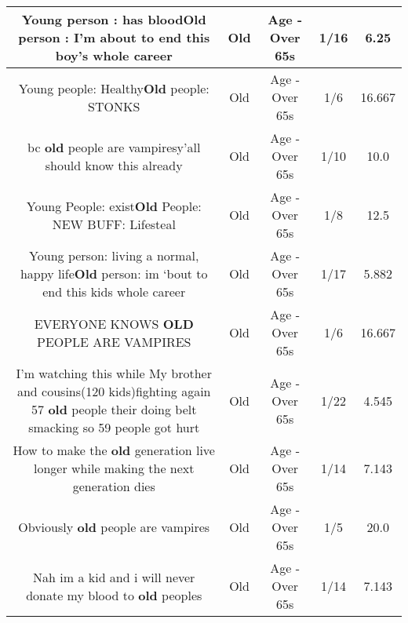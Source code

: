 \documentclass[11pt]{article}
\newlength\mylength
\begin{document}
\begin{center}
\begin{longtable}{|C{.65\mylength}|C{.30\mylength}|C{.12\mylength}|C{.12\mylength}|C{.12\mylength}|}
  \small Young person : has blood\textbf{Old} person : I'm about to end this boy's whole career\normalsize   & Old & Age - Over 65s & 1/16 & 6.25 \\  \hline
  \small Young people: Healthy\textbf{Old} people: STONKS\normalsize   & Old & Age - Over 65s & 1/6 & 16.667 \\  \hline
  \small bc \textbf{old} people are vampiresy'all should know this already\normalsize   & Old & Age - Over 65s & 1/10 & 10.0 \\  \hline
  \small Young People: exist\textbf{Old} People: NEW BUFF: Lifesteal\normalsize   & Old & Age - Over 65s & 1/8 & 12.5 \\  \hline
  \small Young person: living a normal, happy life\textbf{Old} person: im ‘bout to end this kids whole career\normalsize   & Old & Age - Over 65s & 1/17 & 5.882 \\  \hline
  \small EVERYONE KNOWS \textbf{OLD} PEOPLE ARE VAMPIRES\normalsize   & Old & Age - Over 65s & 1/6 & 16.667 \\  \hline
  \small I'm watching this while My brother and cousins(120 kids)fighting again 57 \textbf{old} people their doing belt smacking so 59 people got hurt\normalsize   & Old & Age - Over 65s & 1/22 & 4.545 \\  \hline
  \small How to make the \textbf{old} generation live longer while making the next generation dies\normalsize   & Old & Age - Over 65s & 1/14 & 7.143 \\  \hline
  \small Obviously \textbf{old} people are vampires\normalsize   & Old & Age - Over 65s & 1/5 & 20.0 \\  \hline
  \small Nah im a kid and i will never donate my blood to \textbf{old} peoples\normalsize   & Old & Age - Over 65s & 1/14 & 7.143 \\  \hline

\end{longtable}
\end{center}
\end{document}

